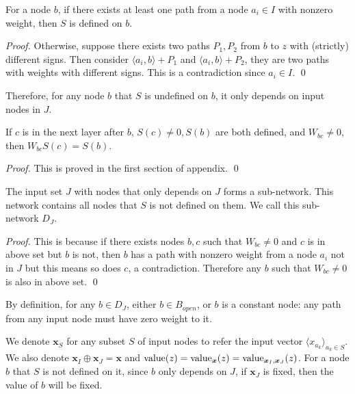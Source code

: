 			\begin{lemma}\label{lem:sign}
				For a node $b$, if there exists at least one path from a node $a_i\in I$ with nonzero weight, then  $S$ is defined on $b$.
			\end{lemma}
			
			\begin{proof}
				Otherwise, suppose there exists two paths $P_1,P_2$ from $b$ to $z$ with (strictly) different signs. Then consider $\langle a_i,b\rangle+P_1$ and $\langle a_i,b\rangle+P_2$, they are two paths with weights with different signs. This is a contradiction since $a_i\in I$. \qed
			\end{proof}
			Therefore, for any node $b$  that $S$ is undefined on $b$, it only depends on input nodes in $J$.  
			
			\begin{lemma}
				If $c$ is in the next layer after $b$, $S(c)\neq 0, S(b)$ are both defined, and $W_{bc}\neq 0$, then $W_{bc}S(c)=S(b)$.
			\end{lemma}
			
			\begin{proof}
				This is proved in the first section of appendix. \qed
			\end{proof}
			
			\begin{lemma}\label{lem:subnetwork2}
				The input set $J$ with nodes that only depends on $J$ forms a sub-network. This network contains all nodes that $S$ is not defined on them. We call this sub-network $D_J$.
			\end{lemma}
			
			\begin{proof}
				This is because if there exists nodes $b,c$ such that $W_{bc}\neq 0$ and $c$ is in above set but $b$ is not, then $b$ has a path with nonzero weight from a node $a_i$ not in $J$ but this means so does $c$, a contradiction. Therefore any $b$ such that $W_{bc}\neq 0$ is also in above set. \qed
			\end{proof}
			
			By definition, for any $b\in D_J$, either $b\in B_{open}$, or $b$ is a constant node:  any path from any input node must have zero weight to it.
			
			We denote $\boldsymbol{x}_S$ for any subset $S$ of input nodes to refer the input vector $\langle x_{a_k}\rangle_{a_k\in S}$. We also denote $\boldsymbol{x}_I\oplus \boldsymbol{x}_J = \boldsymbol{x}$ and ${\textrm{value}}(z)={\textrm{value}}_{\boldsymbol{x}}(z)={\textrm{value}}_{\boldsymbol{x}_I,\boldsymbol{x}_J} (z)$. For a node $b$ that $S$ is not defined on it, since $b$ only depends on $J$, if $\boldsymbol{x}_J$ is fixed, then the value of $b$ will be fixed.
			
